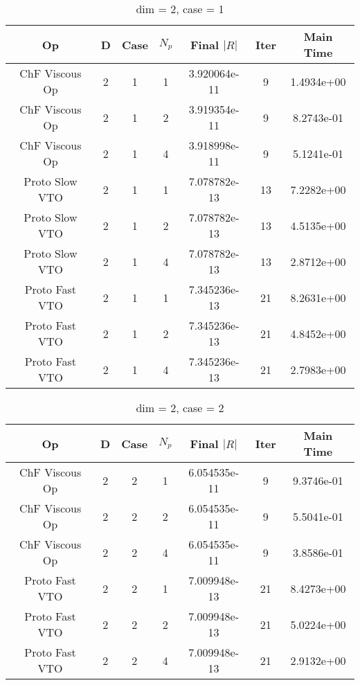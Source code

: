 \documentclass{article}
\begin{document}
\begin{small} 
  \begin{table} [p]
    \begin{center}
      \begin{tabular}{|c|c|c|c|c|c||c|} \hline
        Op & D & Case & $N_p$ & Final $|R|$  &  Iter & Main Time \\
        \hline
        ChF Viscous Op & 2 & 1 & 1& 3.920064e-11 & 9 & 1.4934e+00\\
        ChF Viscous Op & 2 & 1 & 2& 3.919354e-11 & 9 & 8.2743e-01\\
        ChF Viscous Op & 2 & 1 & 4& 3.918998e-11 & 9 & 5.1241e-01\\
        Proto Slow VTO & 2 & 1 & 1& 7.078782e-13 & 13 & 7.2282e+00\\
        Proto Slow VTO & 2 & 1 & 2& 7.078782e-13 & 13 & 4.5135e+00\\
        Proto Slow VTO & 2 & 1 & 4& 7.078782e-13 & 13 & 2.8712e+00\\
        Proto Fast VTO & 2 & 1 & 1& 7.345236e-13 & 21 & 8.2631e+00\\
        Proto Fast VTO & 2 & 1 & 2& 7.345236e-13 & 21 & 4.8452e+00\\
        Proto Fast VTO & 2 & 1 & 4& 7.345236e-13 & 21 & 2.7983e+00\\
        \hline
      \end{tabular} 
    \end{center}   
    \label{__dim_=_2__case_=_1} 
    \caption{dim = 2, case = 1} 
  \end{table} 
\end{small}

\begin{small} 
  \begin{table} 
    \begin{center}
      \begin{tabular}{|c|c|c|c|c|c||c|} \hline
        Op & D & Case & $N_p$ & Final $|R|$  &  Iter & Main Time \\
        \hline
        ChF Viscous Op & 2 & 2 & 1& 6.054535e-11 & 9 & 9.3746e-01\\
        ChF Viscous Op & 2 & 2 & 2& 6.054535e-11 & 9 & 5.5041e-01\\
        ChF Viscous Op & 2 & 2 & 4& 6.054535e-11 & 9 & 3.8586e-01\\
        Proto Fast VTO & 2 & 2 & 1& 7.009948e-13 & 21 & 8.4273e+00\\
        Proto Fast VTO & 2 & 2 & 2& 7.009948e-13 & 21 & 5.0224e+00\\
        Proto Fast VTO & 2 & 2 & 4& 7.009948e-13 & 21 & 2.9132e+00\\
        \hline
      \end{tabular} 
    \end{center}   
    \label{__dim_=_2__case_=_2} 
    \caption{dim = 2, case = 2} 
  \end{table} 
\end{small}
\end{document}
